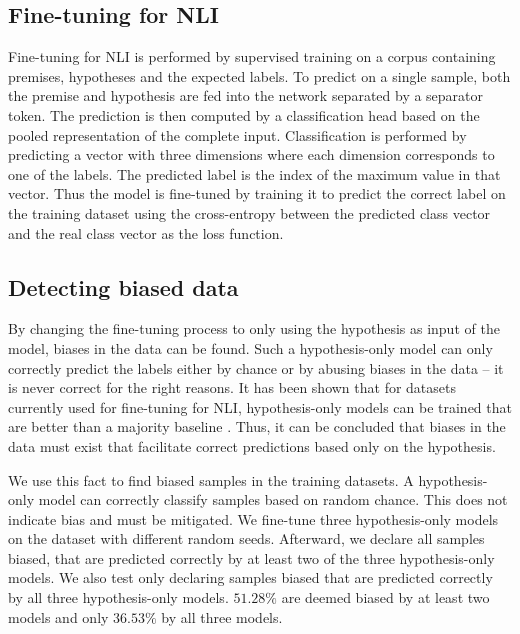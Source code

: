 \subsection{Fine-tuning for \acs{NLI}}

Fine-tuning for \acs{NLI} is performed by supervised training on a corpus containing premises, hypotheses and the expected labels. To predict on a single sample, both the premise and hypothesis are fed into the network separated by a separator token. The prediction is then computed by a classification head based on the pooled representation of the complete input. Classification is performed by predicting a vector with three dimensions where each dimension corresponds to one of the labels. The predicted label is the index of the maximum value in that vector. Thus the model is fine-tuned by training it to predict the correct label on the training dataset using the cross-entropy between the predicted class vector and the real class vector as the loss function.

\subsection{Detecting biased data} \label{sec:method:detecting_biased_data}

By changing the fine-tuning process to only using the hypothesis as input of the model, biases in the data can be found. Such a hypothesis-only model can only correctly predict the labels either by chance or by abusing biases in the data -- it is never correct for the right reasons. It has been shown that for datasets currently used for fine-tuning for \acs{NLI}, hypothesis-only models can be trained that are better than a majority baseline \citep{hyponly}. Thus, it can be concluded that biases in the data must exist that facilitate correct predictions based only on the hypothesis.

We use this fact to find biased samples in the training datasets. A hypothesis-only model can correctly classify samples based on random chance. This does not indicate bias and must be mitigated. We fine-tune three hypothesis-only models on the dataset with different random seeds. Afterward, we declare all samples biased, that are predicted correctly by at least two of the three hypothesis-only models. We also test only declaring samples biased that are predicted correctly by all three hypothesis-only models. $51.28\%$ are deemed biased by at least two models and only $36.53\%$ by all three models.

